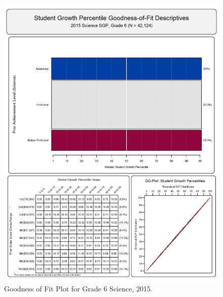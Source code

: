 \documentclass[12pt]{article}
\begin{document}
\begin{figure}[htbp]
\centering
\includegraphics{../img/Goodness_of_Fit/SCIENCE.2015/2015_SCIENCE_6;2014_SCIENCE_5;2013_SCIENCE_4.png}
\caption{Goodness of Fit Plot for Grade 6 Science, 2015.}
\end{figure}
\end{document}
